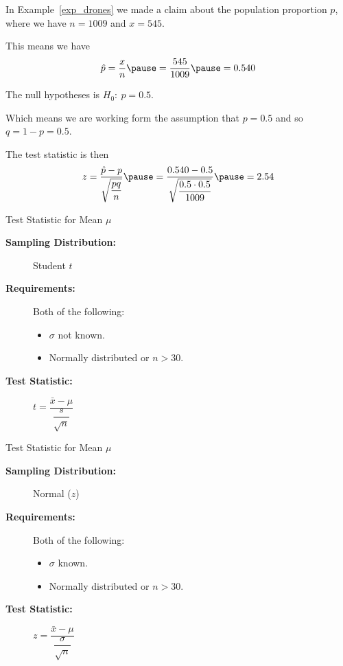 \documentclass{beamer}
\newcommand{\nullhypothesis}[1]{H_0:~{#1}}
\begin{document}
\begin{frame}
\begin{example}
In Example~\ref{exp_drones} we made a claim about the population proportion $p$, where we have $n=1009$ and $x=545$.\pause

\vspace{2mm}
This means we have
\begin{equation*}
\hat{p}=\dfrac{x}{n}\pause
=\dfrac{545}{1009}\pause
=0.540
\end{equation*}\pause

The null hypotheses is $\nullhypothesis{p=0.5}$.\pause

\vspace{2mm}
Which means we are working form the assumption that $p=0.5$ and so $q=1-p=0.5$.\pause

\vspace{2mm}
The test statistic is then
\begin{equation*}
z=\dfrac{\hat{p}-p}{\sqrt{\dfrac{pq}{n}}}\pause
=\dfrac{0.540-0.5}{\sqrt{\dfrac{0.5\cdot 0.5}{1009}}}\pause
=2.54
\end{equation*}
\end{example}
\end{frame}

\begin{frame}
\begin{block}{Test Statistic for Mean $\mu$}
\begin{description}
\item[\textbf{Sampling Distribution:}] Student $t$
\item[\textbf{Requirements:}] Both of the following:
\begin{itemize}
\item $\sigma$ not known.
\item Normally distributed or $n>30$.
\end{itemize}
\item[\textbf{Test Statistic:}] $t=\dfrac{\bar{x}-\mu}{\dfrac{s}{\sqrt{n}}}$
\end{description}
\end{block}\pause

\begin{block}{Test Statistic for Mean $\mu$}
\begin{description}
\item[\textbf{Sampling Distribution:}] Normal ($z$)
\item[\textbf{Requirements:}] Both of the following:
\begin{itemize}
\item $\sigma$ known.
\item Normally distributed or $n>30$.
\end{itemize}
\item[\textbf{Test Statistic:}] $z=\dfrac{\bar{x}-\mu}{\dfrac{\sigma}{\sqrt{n}}}$
\end{description}
\end{block}
\end{frame}
\end{document}
